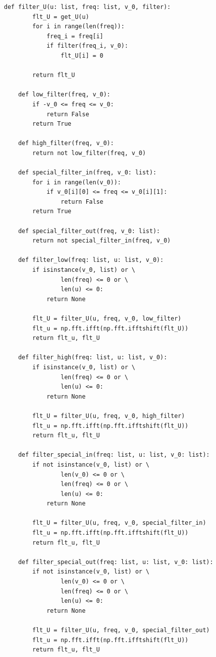 \documentclass[a4paper, 12pt]{article}
\begin{document}
    \begin{lstlisting}[label=l4, caption={Файл filters.py. Реализация фильтров.}]
    def filter_U(u: list, freq: list, v_0, filter):
        flt_U = get_U(u)
        for i in range(len(freq)):
            freq_i = freq[i]
            if filter(freq_i, v_0):
                flt_U[i] = 0
    
        return flt_U
    
    def low_filter(freq, v_0):
        if -v_0 <= freq <= v_0:
            return False
        return True
    
    def high_filter(freq, v_0):
        return not low_filter(freq, v_0)
    
    def special_filter_in(freq, v_0: list):
        for i in range(len(v_0)):
            if v_0[i][0] <= freq <= v_0[i][1]:
                return False
        return True

    def special_filter_out(freq, v_0: list):
        return not special_filter_in(freq, v_0)
    
    def filter_low(freq: list, u: list, v_0):
        if isinstance(v_0, list) or \
                len(freq) <= 0 or \
                len(u) <= 0:
            return None
    
        flt_U = filter_U(u, freq, v_0, low_filter)
        flt_u = np.fft.ifft(np.fft.ifftshift(flt_U))
        return flt_u, flt_U
    
    def filter_high(freq: list, u: list, v_0):
        if isinstance(v_0, list) or \
                len(freq) <= 0 or \
                len(u) <= 0:
            return None
    
        flt_U = filter_U(u, freq, v_0, high_filter)
        flt_u = np.fft.ifft(np.fft.ifftshift(flt_U))
        return flt_u, flt_U
    
    def filter_special_in(freq: list, u: list, v_0: list):
        if not isinstance(v_0, list) or \
                len(v_0) <= 0 or \
                len(freq) <= 0 or \
                len(u) <= 0:
            return None
    
        flt_U = filter_U(u, freq, v_0, special_filter_in)
        flt_u = np.fft.ifft(np.fft.ifftshift(flt_U))
        return flt_u, flt_U

    def filter_special_out(freq: list, u: list, v_0: list):
        if not isinstance(v_0, list) or \
                len(v_0) <= 0 or \
                len(freq) <= 0 or \
                len(u) <= 0:
            return None
    
        flt_U = filter_U(u, freq, v_0, special_filter_out)
        flt_u = np.fft.ifft(np.fft.ifftshift(flt_U))
        return flt_u, flt_U
    \end{lstlisting}
\end{document}
